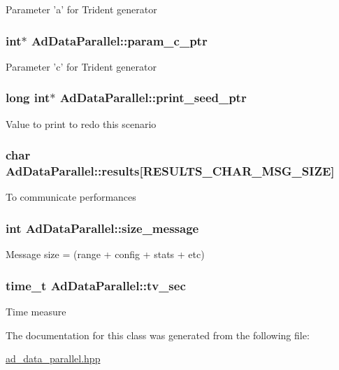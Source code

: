 \-Parameter 'a' for \-Trident generator \hypertarget{classAdDataParallel_ade1456a48c972070bab91e0a93cd61dd}{
\subsubsection[{param\-\_\-c\-\_\-ptr}]{\setlength{\rightskip}{0pt plus 5cm}int$\ast$ {\bf \-Ad\-Data\-Parallel\-::param\-\_\-c\-\_\-ptr}}}\label{classAdDataParallel_ade1456a48c972070bab91e0a93cd61dd}
\-Parameter 'c' for \-Trident generator \hypertarget{classAdDataParallel_a5391ad235753151f07dfc1c01d58e88d}{
\subsubsection[{print\-\_\-seed\-\_\-ptr}]{\setlength{\rightskip}{0pt plus 5cm}long int$\ast$ {\bf \-Ad\-Data\-Parallel\-::print\-\_\-seed\-\_\-ptr}}}\label{classAdDataParallel_a5391ad235753151f07dfc1c01d58e88d}
\-Value to print to redo this scenario \hypertarget{classAdDataParallel_a4919da41f748bd6286d59c9c9f72c344}{
\subsubsection[{results}]{\setlength{\rightskip}{0pt plus 5cm}char {\bf \-Ad\-Data\-Parallel\-::results}\mbox{[}\-R\-E\-S\-U\-L\-T\-S\-\_\-\-C\-H\-A\-R\-\_\-\-M\-S\-G\-\_\-\-S\-I\-Z\-E\mbox{]}}}\label{classAdDataParallel_a4919da41f748bd6286d59c9c9f72c344}
\-To communicate performances \hypertarget{classAdDataParallel_a5ecf007c3aa55587262e26277f57bdf3}{
\subsubsection[{size\-\_\-message}]{\setlength{\rightskip}{0pt plus 5cm}int {\bf \-Ad\-Data\-Parallel\-::size\-\_\-message}}}\label{classAdDataParallel_a5ecf007c3aa55587262e26277f57bdf3}
\-Message size = (range + config + stats + etc) \hypertarget{classAdDataParallel_ac69a52aa7b4b4b9c61f9bfaea3ec2143}{
\subsubsection[{tv\-\_\-sec}]{\setlength{\rightskip}{0pt plus 5cm}time\-\_\-t {\bf \-Ad\-Data\-Parallel\-::tv\-\_\-sec}}}\label{classAdDataParallel_ac69a52aa7b4b4b9c61f9bfaea3ec2143}
\-Time measure 

\-The documentation for this class was generated from the following file\-:\begin{DoxyCompactItemize}
\item 
\hyperlink{ad__data__parallel_8hpp}{ad\-\_\-data\-\_\-parallel.\-hpp}\end{DoxyCompactItemize}

